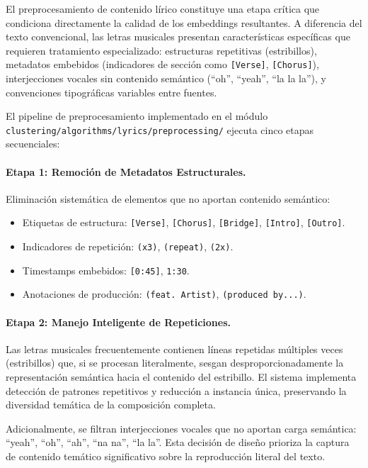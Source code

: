El preprocesamiento de contenido lírico constituye una etapa crítica que condiciona directamente la calidad de los embeddings resultantes. A diferencia del texto convencional, las letras musicales presentan características específicas que requieren tratamiento especializado: estructuras repetitivas (estribillos), metadatos embebidos (indicadores de sección como \texttt{[Verse]}, \texttt{[Chorus]}), interjecciones vocales sin contenido semántico (``oh'', ``yeah'', ``la la la''), y convenciones tipográficas variables entre fuentes.

El pipeline de preprocesamiento implementado en el módulo \texttt{clustering/algorithms/lyrics/preprocessing/} ejecuta cinco etapas secuenciales:

\paragraph{Etapa 1: Remoción de Metadatos Estructurales.}
Eliminación sistemática de elementos que no aportan contenido semántico:
\begin{itemize}
    \item Etiquetas de estructura: \texttt{[Verse]}, \texttt{[Chorus]}, \texttt{[Bridge]}, \texttt{[Intro]}, \texttt{[Outro]}.
    \item Indicadores de repetición: \texttt{(x3)}, \texttt{(repeat)}, \texttt{(2x)}.
    \item Timestamps embebidos: \texttt{[0:45]}, \texttt{1:30}.
    \item Anotaciones de producción: \texttt{(feat.\ Artist)}, \texttt{(produced by...)}.
\end{itemize}

\paragraph{Etapa 2: Manejo Inteligente de Repeticiones.}
Las letras musicales frecuentemente contienen líneas repetidas múltiples veces (estribillos) que, si se procesan literalmente, sesgan desproporcionadamente la representación semántica hacia el contenido del estribillo. El sistema implementa detección de patrones repetitivos y reducción a instancia única, preservando la diversidad temática de la composición completa.

Adicionalmente, se filtran interjecciones vocales que no aportan carga semántica: ``yeah'', ``oh'', ``ah'', ``na na'', ``la la''. Esta decisión de diseño prioriza la captura de contenido temático significativo sobre la reproducción literal del texto.

